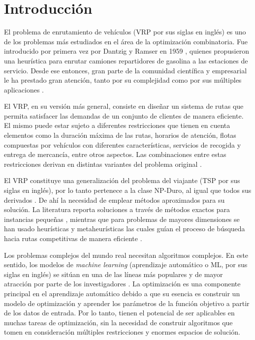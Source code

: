 \chapter*{Introducción}\label{chapter:introduction}

\qquad 

El problema de enrutamiento de vehículos (VRP por sus siglas en inglés) es uno de los problemas más estudiados en el área de la optimización combinatoria. Fue introducido por primera vez por Dantzig y Ramser en 1959 \cite{Ramsin1959}, quienes propusieron una heurística para enrutar camiones repartidores de gasolina a las estaciones de servicio. Desde ese entonces, gran parte de la comunidad científica y empresarial le ha prestado gran atención, tanto por su complejidad como por sus múltiples aplicaciones \cite{PaoloVigo}.

El VRP, en su versión más general, consiste en diseñar un sistema de rutas que permita satisfacer las demandas de un conjunto de clientes de manera eficiente. El mismo puede estar sujeto a diferentes restricciones que tienen en cuenta elementos como la duración máxima de las rutas, horarios de atención, flotas compuestas por vehículos con diferentes características, servicios de recogida y entrega de mercancía, entre otros aspectos. Las combinaciones entre estas restricciones derivan en distintas variantes del problema original \cite{PaoloVigo}.

El VRP constituye una generalización del problema del viajante (TSP por sus siglas en inglés), por lo tanto pertenece a la clase NP-Duro, al igual que todos sus derivados \cite{PaoloVigo}. De ahí la necesidad de emplear métodos aproximados para su solución. La literatura reporta soluciones a través de métodos exactos para instancias pequeñas \cite{ExactSurveyGilbert, ExactSpanningToth}, mientras que para problemas de mayores dimensiones se han usado heurísticas y metaheurísticas las cuales guían el proceso de búsqueda hacia rutas competitivas de manera eficiente \cite{PaoloVigo} . 

Los problemas complejos del mundo real necesitan algoritmos complejos. En este sentido, los modelos de \textit{machine learning} (aprendizaje automático o ML, por sus siglas en inglés) se sitúan en una de las líneas más populares y de mayor atracción por parte de los investigadores \cite{MLOptimization, MLVRPSurvey}. La optimización es una componente principal en el aprendizaje automático debido a que su esencia es construir un modelo de optimización y aprender los parámetros de la función objetivo a partir de los datos de entrada. Por lo tanto, tienen el potencial de ser aplicables en muchas tareas de optimización, sin la necesidad de construir algoritmos que tomen en consideración múltiples restricciones y enormes espacios de solución.

